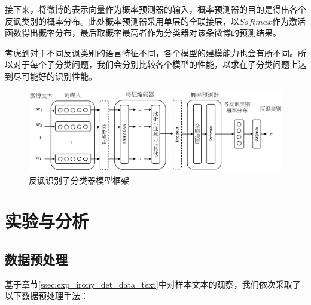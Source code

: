 接下来，将微博的表示向量作为概率预测器的输入，概率预测器的目的是得出各个反讽类别的概率分布。此处概率预测器采用单层的全联接层，以$Softmax$作为激活函数得出概率分布，最后取概率最高者作为分类器对该条微博的预测结果。

考虑到对于不同反讽类别的语言特征不同，各个模型的建模能力也会有所不同。所以对于每个子分类问题，我们会分别比较各个模型的性能，以求在子分类问题上达到尽可能好的识别性能。

\begin{figure}[H]
  \centering
  \includegraphics[width=\textwidth]{img/irony_det_cls_framework.pdf}
  \caption{反讽识别子分类器模型框架}
  \label{fig:irony_det_cls_framework}
\end{figure}

\section{实验与分析}
\label{sec:exp_irony_det_exp}

\subsection{数据预处理}
\label{ssec:exp_irony_det_text_preprocess}

基于章节\ref{ssec:exp_irony_det_data_text}中对样本文本的观察，我们依次采取了以下数据预处理手法：

